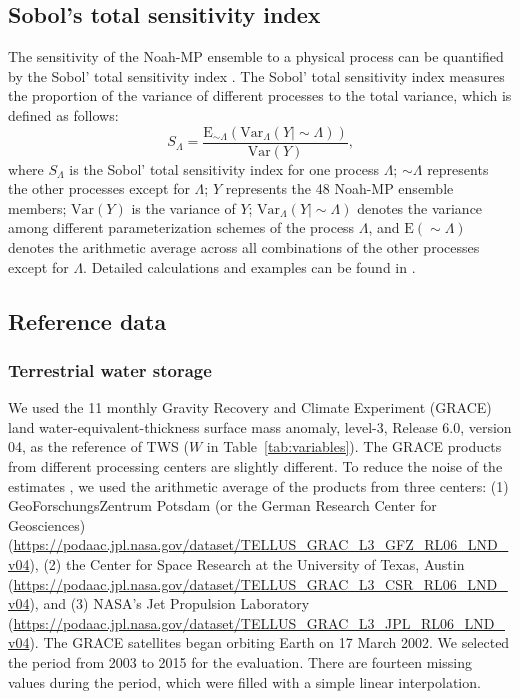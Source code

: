 \documentclass[essd, manuscript]{copernicus}
\begin{document}
\subsection{Sobol's total sensitivity index}\label{sec:methods:sobol}

The sensitivity of the Noah-MP ensemble to a physical process can be quantified by the Sobol' total sensitivity index \citep{sobol1993MMCE, zheng2019WRR}. The Sobol' total sensitivity index measures the proportion of the variance of different processes to the total variance, which is defined as follows:
\begin{equation}
  S_{\Lambda} = \frac{\mathrm{E}_{\sim\Lambda}(\mathrm{Var}_{\Lambda}(Y|\sim\Lambda))}{\mathrm{Var}(Y)}
  \text{,}
\end{equation}
where \(S_{\Lambda}\) is the Sobol' total sensitivity index for one process \(\Lambda\); \(\sim\Lambda\) represents the other processes except for \(\Lambda\); \(Y\) represents the 48 Noah-MP ensemble members; \(\mathrm{Var}(Y)\) is the variance of \(Y\); \(\mathrm{Var}_{\Lambda}(Y|\sim\Lambda)\) denotes the variance among different parameterization schemes of the process \(\Lambda\), and \(\mathrm{E}(\sim\Lambda)\) denotes the arithmetic average across all combinations of the other processes except for \(\Lambda\). Detailed calculations and examples can be found in \citet[Appendix A]{zheng2019WRR}.

\subsection{Reference data}\label{sec:methods:ref}

\subsubsection{Terrestrial water storage}\label{sec:methods:ref:tws}

We used the 1\degree{}\times{}1\degree{} monthly Gravity Recovery and Climate Experiment (GRACE) land water-equivalent-thickness surface mass anomaly, level-3, Release 6.0, version 04, as the reference of TWS (\(W\) in Table~\ref{tab:variables}). The GRACE products from different processing centers are slightly different. To reduce the noise of the estimates \citep{sakumura2014GRL}, we used the arithmetic average of the products from three centers: (1) GeoForschungsZentrum Potsdam (or the German Research Center for Geosciences) (\url{https://podaac.jpl.nasa.gov/dataset/TELLUS_GRAC_L3_GFZ_RL06_LND_v04}), (2) the Center for Space Research at the University of Texas, Austin (\url{https://podaac.jpl.nasa.gov/dataset/TELLUS_GRAC_L3_CSR_RL06_LND_v04}), and (3) NASA's Jet Propulsion Laboratory (\url{https://podaac.jpl.nasa.gov/dataset/TELLUS_GRAC_L3_JPL_RL06_LND_v04}). The GRACE satellites began orbiting Earth on 17 March 2002. We selected the period from 2003 to 2015 for the evaluation. There are fourteen missing values during the period, which were filled with a simple linear interpolation.
\end{document}
